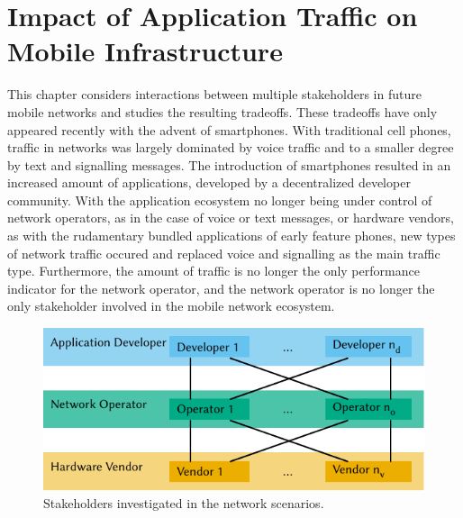 \chapter{Impact of Application Traffic on Mobile Infrastructure}\label{chap:network}
This chapter considers interactions between multiple stakeholders in future mobile networks and studies the resulting tradeoffs.
These tradeoffs have only appeared recently with the advent of smartphones.
With traditional cell phones, traffic in networks was largely dominated by voice traffic and to a smaller degree by text and signalling messages.
The introduction of smartphones resulted in an increased amount of applications, developed by a decentralized developer community.
With the application ecosystem no longer being under control of network operators, as in the case of voice or text messages, or hardware vendors, as with the rudamentary bundled applications of early feature phones, new types of network traffic occured and replaced voice and signalling as the main traffic type.
Furthermore, the amount of traffic is no longer the only performance indicator for the network operator, and the network operator is no longer the only stakeholder involved in the mobile network ecosystem.

\begin{figure}
  \centering
  \includegraphics{network/figures/stakeholders}
  \caption{Stakeholders investigated in the network scenarios.}
  \label{fig:network:stakeholders}
\end{figure}

